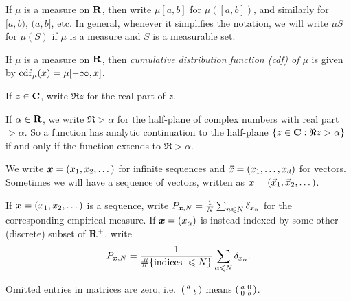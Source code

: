 If $\mu$ is a measure on $\mathbf{R}$, then write $\mu[a,b]$ for $\mu([a,b])$, and 
similarly for $[a,b)$, $(a,b]$, etc. In general, whenever it simplifies the 
notation, we will write $\mu S$ for $\mu(S)$ if $\mu$ is a measure and 
$S$ is a measurable set. 

If $\mu$ is a measure on $\mathbf{R}$, then \emph{cumulative distribution function 
(cdf) of $\mu$} is given by $\operatorname{cdf}_\mu(x) = \mu[-\infty,x]$. 

If $z\in \mathbf{C}$, write $\Re z$ for the real part of $z$. 

If $\alpha\in \mathbf{R}$, we write $\Re > \alpha$ for the half-plane of complex 
numbers with real part $> \alpha$. So a function has analytic continuation to 
the half-plane $\{z\in \mathbf{C} : \Re z > \alpha\}$ if and only if the function 
extends to $\Re > \alpha$. 

We write ${\boldsymbol x} = (x_1,x_2,\dots)$ for infinite sequences and 
$\vec{x} = (x_1,\dots,x_d)$ for vectors. Sometimes we will have a sequence of 
vectors, written as ${\boldsymbol x} = (\vec{x}_1,\vec{x}_2,\dots)$. 

If ${\boldsymbol x}=(x_1,x_2,\dots)$ is a sequence, write 
$P_{{\boldsymbol x},N} = \frac{1}{N} \sum_{n\leqslant N} \delta_{x_n}$ for the 
corresponding empirical measure. If ${\boldsymbol x}=(x_\alpha)$ is instead indexed by 
some other (discrete) subset of $\mathbf{R}^+$, write 
\[
	P_{{\boldsymbol x},N} = \frac{1}{\# \{\text{indices }\leqslant N\}}\sum_{\alpha \leqslant N} \delta_{x_\alpha} .
\]

Omitted entries in matrices are zero, i.e.~$\left(\begin{smallmatrix} a &  \\  & b \end{smallmatrix}\right)$ means 
$\left(\begin{smallmatrix} a & 0 \\ 0 & b \end{smallmatrix}\right)$. 
